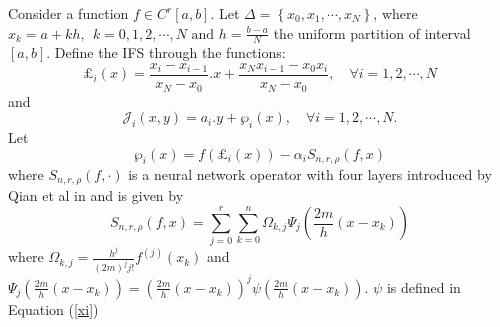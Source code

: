 \documentclass{article}[12pt, a4]
\begin{document}
	Consider a function $f\in C^{r}[a,b]$. Let $\Delta=\left\{x_0,x_1,\cdots, x_N\right \}$, where $x_k=a+kh,~~ k=0,1,2,\cdots,N \text{ and } h=\frac{b-a}{N}$ the uniform partition of interval $[a,b]$. Define the IFS through the functions:
	\begin{equation}\label{l22}
		\pounds_i(x)= \frac{x_i -x_{i-1}}{x_N-x_0}.x +\frac{x_N x_{i-1} -x_0 x_i}{x_N-x_0}, \quad \forall i=1,2,\cdots,N
	\end{equation}
	and 
	\begin{equation}\label{f22}
		\mathcal{J}_i(x,y)=a_{i}.y+ \wp_{i}(x), \quad \forall i=1,2,\cdots,N.
	\end{equation}
	Let
	\begin{equation} \label{qi1}
		\wp_{i}(x)= f(\pounds_{i}(x))-\alpha_{i}S_{n,r,\rho}(f, x)
	\end{equation}
	where $S_{n,r,\rho}(f, \cdot)$ is a neural network operator with four layers introduced by Qian et al in \cite{QIAN2022126781} and is given by
	\begin{equation*}
		S_{n,r,\rho}(f, x)=\sum_{j=0}^{r}\sum_{k=0}^{n}\Omega_{k,j}\Psi_{j}\left(\frac{2m}{h}\left(x-x_k\right)\right)
	\end{equation*}
	where $\Omega_{k,j}=\frac{h^j}{(2m)^j j!}f^{(j)}(x_k)$ and $\Psi_j\left(\frac{2m}{h}\left(x-x_k\right)\right) =\left(\frac{2m}{h}\left(x-x_k\right)\right)^{j}\psi\left(\frac{2m}{h}\left(x-x_k\right)\right).$
	$\psi$ is defined in Equation (\ref{xi})\\
	
\end{document}
